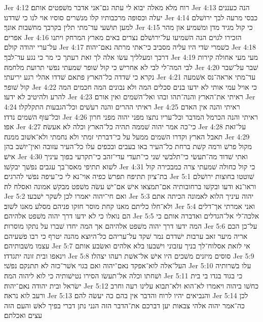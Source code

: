 Jer 4:12  רוח מלא מאלה יבוא לי עתה גם־אני אדבר משׁפטים אותם׃
Jer 4:13  הנה כעננים יעלה וכסופה מרכבותיו קלו מנשׁרים סוסיו אוי לנו כי שׁדדנו׃
Jer 4:14  כבסי מרעה לבך ירושׁלם למען תושׁעי עד־מתי תלין בקרבך מחשׁבות אונך׃
Jer 4:15  כי קול מגיד מדן ומשׁמיע און מהר אפרים׃
Jer 4:16  הזכירו לגוים הנה השׁמיעו על־ירושׁלם נצרים באים מארץ המרחק ויתנו על־ערי יהודה קולם׃
Jer 4:17  כשׁמרי שׂדי היו עליה מסביב כי־אתי מרתה נאם־יהוה׃
Jer 4:18  דרכך ומעלליך עשׂו אלה לך זאת רעתך כי מר כי נגע עד־לבך׃
Jer 4:19  מעי מעי אחולה קירות לבי המה־לי לבי לא אחרישׁ כי קול שׁופר שׁמעתי נפשׁי תרועת מלחמה׃
Jer 4:20  שׁבר על־שׁבר נקרא כי שׁדדה כל־הארץ פתאם שׁדדו אהלי רגע יריעתי׃
Jer 4:21  עד־מתי אראה־נס אשׁמעה קול שׁופר׃
Jer 4:22  כי אויל עמי אותי לא ידעו בנים סכלים המה ולא נבונים המה חכמים המה להרע ולהיטיב לא ידעו׃
Jer 4:23  ראיתי את־הארץ והנה־תהו ובהו ואל־השׁמים ואין אורם׃
Jer 4:24  ראיתי ההרים והנה רעשׁים וכל־הגבעות התקלקלו׃
Jer 4:25  ראיתי והנה אין האדם וכל־עוף השׁמים נדדו׃
Jer 4:26  ראיתי והנה הכרמל המדבר וכל־עריו נתצו מפני יהוה מפני חרון אפו׃
Jer 4:27  כי־כה אמר יהוה שׁממה תהיה כל־הארץ וכלה לא אעשׂה׃
Jer 4:28  על־זאת תאבל הארץ וקדרו השׁמים ממעל על כי־דברתי זמתי ולא נחמתי ולא־אשׁוב ממנה׃
Jer 4:29  מקול פרשׁ ורמה קשׁת ברחת כל־העיר באו בעבים ובכפים עלו כל־העיר עזובה ואין־יושׁב בהן אישׁ׃
Jer 4:30  ואתי שׁדוד מה־תעשׂי כי־תלבשׁי שׁני כי־תעדי עדי־זהב כי־תקרעי בפוך עיניך לשׁוא תתיפי מאסו־בך עגבים נפשׁך יבקשׁו׃
Jer 4:31  כי קול כחולה שׁמעתי צרה כמבכירה קול בת־ציון תתיפח תפרשׂ כפיה אוי־נא לי כי־עיפה נפשׁי להרגים׃
Jer 5:1  שׁוטטו בחוצות ירושׁלם וראו־נא ודעו ובקשׁו ברחובותיה אם־תמצאו אישׁ אם־ישׁ עשׂה משׁפט מבקשׁ אמונה ואסלח לה׃
Jer 5:2  ואם חי־יהוה יאמרו לכן לשׁקר ישׁבעו׃
Jer 5:3  יהוה עיניך הלוא לאמונה הכיתה אתם ולא־חלו כליתם מאנו קחת מוסר חזקו פניהם מסלע מאנו לשׁוב׃
Jer 5:4  ואני אמרתי אך־דלים הם נואלו כי לא ידעו דרך יהוה משׁפט אלהיהם׃
Jer 5:5  אלכה־לי אל־הגדלים ואדברה אותם כי המה ידעו דרך יהוה משׁפט אלהיהם אך המה יחדו שׁברו על נתקו מוסרות׃
Jer 5:6  על־כן הכם אריה מיער זאב ערבות ישׁדדם נמר שׁקד על־עריהם כל־היוצא מהנה יטרף כי רבו פשׁעיהם עצמו משׁבותיהם׃
Jer 5:7  אי לזאת אסלוח־לך בניך עזבוני וישׁבעו בלא אלהים ואשׂבע אותם וינאפו ובית זונה יתגדדו׃
Jer 5:8  סוסים מיזנים משׁכים היו אישׁ אל־אשׁת רעהו יצהלו׃
Jer 5:9  העל־אלה לוא־אפקד נאם־יהוה ואם בגוי אשׁר־כזה לא תתנקם נפשׁי׃
Jer 5:10  עלו בשׁרותיה ושׁחתו וכלה אל־תעשׂו הסירו נטישׁותיה כי לוא ליהוה המה׃
Jer 5:11  כי בגוד בגדו בי בית ישׂראל ובית יהודה נאם־יהוה׃
Jer 5:12  כחשׁו ביהוה ויאמרו לא־הוא ולא־תבוא עלינו רעה וחרב ורעב לוא נראה׃
Jer 5:13  והנביאים יהיו לרוח והדבר אין בהם כה יעשׂה להם׃
Jer 5:14  לכן כה־אמר יהוה אלהי צבאות יען דברכם את־הדבר הזה הנני נתן דברי בפיך לאשׁ והעם הזה עצים ואכלתם׃
